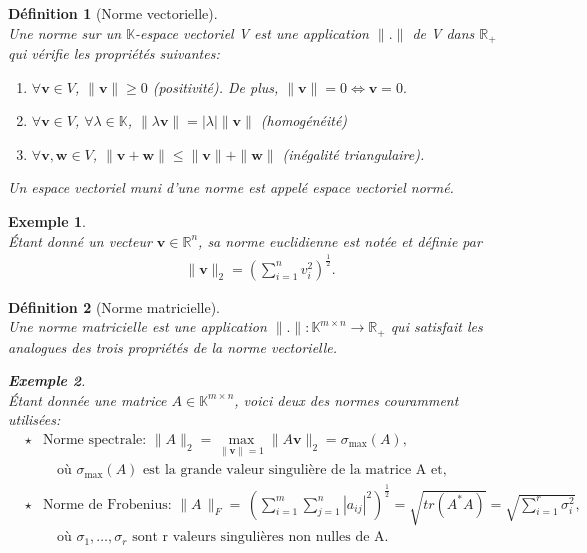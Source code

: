\documentclass[11pt,a4paper,oneside]{book}
\newtheorem{defi}{Définition}[chapter]
\newtheorem{ex}{Exemple}[chapter]}
\def\R{\mathbb R}
\def\K{\mathbb K}
\def\v{\mathbf v}
\def\w{\mathbf w}
\newcommand{\pf}[2]{\frac{#1}{#2}}
\begin{document}
\begin{defi}[Norme vectorielle]
	\emph{\\}
	Une norme sur un $ \K $-espace vectoriel V est une application $ \parallel.\parallel $ de V dans $\R_{+}  $ qui vérifie les propriétés suivantes:
	\begin{enumerate}
		\item[$ (1) $]$ \forall \v\in V $, $ \parallel\v\parallel\geq 0 $ (positivité). De plus,  $ \parallel \v \parallel=0\Leftrightarrow\v=0. $
		\item[$ (2) $]$ \forall\v\in V $, $ \forall \lambda\in\K $, $ \parallel\lambda\v\parallel=|\lambda|\parallel\v\parallel $ (homogénéité)
		\item[$ (3) $]$ \forall \v,\w\in V $, $ \parallel\v+\w \parallel\leq \parallel\v\parallel+\parallel\w\parallel$ (inégalité triangulaire).
	\end{enumerate} Un espace vectoriel muni d'une norme est appelé espace vectoriel normé.
\end{defi}
\begin{ex}
	\emph{\\}
 Étant donné un vecteur $ \v\in\R^{n} $, sa norme euclidienne est notée et définie par
\begin{eqnarray}
\parallel\v\parallel_{2}=\left(\sum_{i=1}^{n}v_{i}^{2}\right)^{\pf{1}{2}}.
\end{eqnarray}

\end{ex}

\begin{defi}[Norme matricielle]
\emph{\\}
 Une norme matricielle est une application $ \parallel.\parallel:\K^{m\times n}\longrightarrow\R_{+} $ qui satisfait les analogues des trois propriétés de la norme vectorielle. 
\begin{ex}\emph{\\}
Étant donnée une matrice $ A\in\K^{m\times n} $, voici deux des normes couramment utilisées:
\begin{eqnarray}
&\star&\text{Norme spectrale: }\parallel A\parallel_{2}=\underset{\parallel\v\parallel=1}{\max}\parallel A\v\parallel_{2}=\sigma_{\max}(A),\\
&&\quad \text{où }\sigma_{\max}(A) \text{ est la grande valeur singulière de la matrice A et,}\nonumber\\
&\star&\text{Norme de Frobenius: }\parallel\!A\,\parallel_{F}=\,\left(\sum_{i=1}^{m}\sum_{j=1}^{n}|a_{ij}|^{2}\right)^{\pf{1}{2}}=\sqrt{tr(A^{*}A)}=\sqrt{\sum_{i=1}^{r}\sigma_{i}^{2}},\label{frobmatrix}\quad\\
&&\quad \text{où }\sigma_{1},\dots,\sigma_{r} \text{ sont r valeurs singulières non nulles de A}.\nonumber
\end{eqnarray}
\end{ex}
\end{defi}
\end{document}

